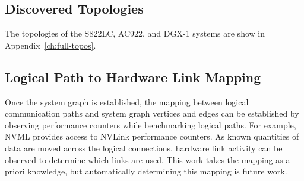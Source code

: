 \subsection{Discovered Topologies}

The topologies of the S822LC, AC922, and DGX-1 systems are show in Appendix~\ref{ch:full-topos}.


\subsection{Logical Path to Hardware Link Mapping}
\label{sec:logical-hardware-mapping}

Once the system graph is established, the mapping between logical communication paths and system graph vertices and edges can be established by observing performance counters while benchmarking logical paths.
For example, NVML provides access to NVLink performance counters.
As known quantities of data are moved across the logical connections, hardware link activity can be observed to determine which links are used.
This work takes the mapping as a-priori knowledge, but automatically determining this mapping is future work.